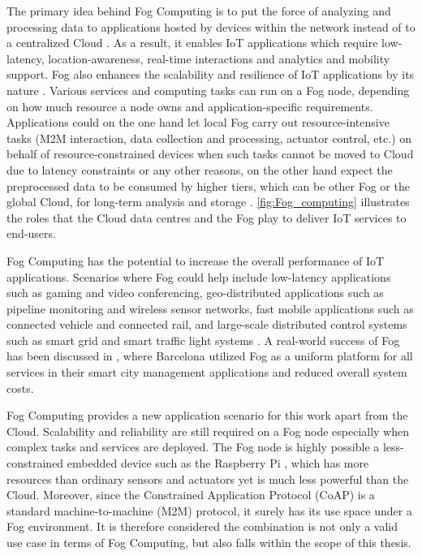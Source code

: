 The primary idea behind Fog Computing is to put the force of analyzing and processing data to applications hosted by devices within the network instead of to a centralized Cloud \autocite{7033259}. As a result, it enables IoT applications which require low-latency, location-awareness, real-time interactions and analytics and mobility support. Fog also enhances the scalability and resilience of IoT applications by its nature \autocite{7123563}. Various services and computing tasks can run on a Fog node, depending on how much resource a node owns and application-specific requirements. Applications could on the one hand let local Fog carry out resource-intensive tasks (M2M interaction, data collection and processing, actuator control, etc.) on behalf of resource-constrained devices when such tasks cannot be moved to Cloud due to latency constraints or any other reasons, on the other hand expect the preprocessed data to be consumed by higher tiers, which can be other Fog or the global Cloud, for long-term analysis and storage \autocite{7498684}. \autoref{fig:Fog_computing} illustrates the roles that the Cloud data centres and the Fog play to deliver IoT services to end-users. 

Fog Computing has the potential to increase the overall performance of IoT applications. Scenarios where Fog could help include low-latency applications such as gaming and video conferencing, geo-distributed applications such as pipeline monitoring and wireless sensor networks, fast mobile applications such as connected vehicle and connected rail, and large-scale distributed control systems such as smart grid and smart traffic
light systems \autocite{bonomi2014fog}. A real-world success of Fog has been discussed in \autocite{7498684}, where Barcelona utilized Fog as a uniform platform for all services in their smart city management applications and reduced overall system costs.

Fog Computing provides a new application scenario for this work apart from the Cloud. Scalability and reliability are still required on a Fog node especially when complex tasks and services are deployed. The Fog node is highly possible a less-constrained embedded device such as the Raspberry Pi \autocite{raspberry_pi}, which has more resources than ordinary sensors and actuators yet is much less powerful than the Cloud. Moreover, since the Constrained Application Protocol (CoAP) is a standard machine-to-machine (M2M) protocol, it surely has its use space under a Fog environment. It is therefore considered the combination is not only a valid use case in terms of Fog Computing, but also falls within the scope of this thesis. 

